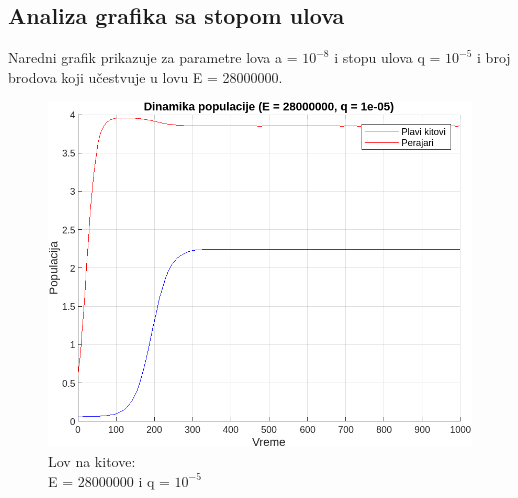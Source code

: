 \documentclass[a4paper]{article}
\begin{document}
{	\newpage
	
	\subsection{Analiza grafika sa stopom ulova}
	\label{sec: analiza-grafika-sa-stopm-ulova}
	
	Naredni grafik prikazuje za parametre lova a = $10^{-8}$ i stopu ulova q = $10^{-5}$ i broj brodova koji učestvuje u lovu E = 28000000.
	
	\begin{figure}[h]
		\centering
		\begin{minipage}[h]{0.45\linewidth}
			\centering
			\includegraphics[width=\textwidth]{lov1.png}
			\caption{Lov na kitove: \\E = $28000000$ i q = $10^{-5}$}
			\label{slika1: lov-1}
		\end{minipage}
	\end{figure}
	
}
\end{document}
